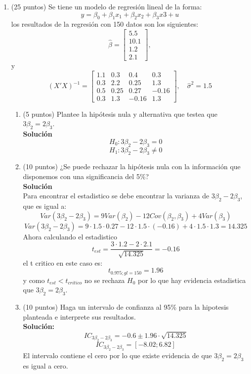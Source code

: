\documentclass[10pt,a4paper]{article}
\begin{document}
\begin{enumerate}
\item (25 puntos) Se tiene un modelo de regresión lineal de la forma:
$$y=\beta_0 + \beta_1 x_1+\beta_2x_2+\beta_3 x3 + u$$
los resultados de la regresión con 150 datos son los siguientes:
        \[
          \hat{\beta} = \begin{bmatrix} 5.5 \\ 10.1 \\ 1.2 \\ 2.1 \end{bmatrix},
        \]
y 
        \[
          (X'X)^{-1} =
          \begin{bmatrix}
1.1 & 0.3  & 0.4  &  0.3\\
0.3 & 2.2  & 0.25  & 1.3\\
0.5 & 0.25  & 0.27  & -0.16\\
0.3 & 1.3 & -0.16 &  1.3
\end{bmatrix},
          \quad \hat{\sigma}^2 = 1.5
        \]
\begin{enumerate}
    \item (5 puntos) Plantee la hipótesis nula y alternativa que testea que $3\beta_2=2\beta_3$.
\\
\textbf{Solución}
\\
$$H_0 : 3\beta_2-2\beta_3=0$$
$$H_1 : 3\beta_2-2\beta_3\neq0$$

    \item (10 puntos) ¿Se puede rechazar la hipótesis nula con la información que disponemos con una significancia del 5\%?\\
    \textbf{Solución}
    \\
    Para encontrar el estadistico se debe encontrar la varianza de $3\beta_2-2\beta_3$, que es igual a:
    $$Var(3\beta_2-2\beta_3)=9Var(\beta_2) - 12Cov(\beta_2,\beta_3) + 4Var(\beta_3)$$
    $$Var(3\beta_2-2\beta_3)=9\cdot 1.5\cdot0.27-12\cdot 1.5 \cdot (-0.16) + 4\cdot 1.5\cdot 1.3= 14.325$$
    Ahora calculando el estadistico
    $$t_{est}=\frac{3\cdot 1.2 -2\cdot2.1}{\sqrt{14.325}}=-0.16$$
    el t critico en este caso es:
    $$t_{0.975;gl=150}=1.96$$
    y como $t_{est}<t_{critico}$ no se rechaza $H_0$ por lo que hay evidencia estadistica que $3\beta_2=2\beta_3$.

    \item (10 puntos) Haga un intervalo de confianza al 95\% para la hipotesis planteada e interprete sus resultados.
    \\
    \textbf{Solución:} \\
    $$IC_{3\beta_2-2\beta_3} = -0.6 \pm 1.96\cdot \sqrt{14.325} $$
    $$IC_{3\beta_2-2\beta_3} = [-8.02;6.82] $$
    El intervalo contiene el cero por lo que existe evidencia de que $3\beta_2=2\beta_3$ es igual a cero.
\end{enumerate}


\end{enumerate}
\end{document}
